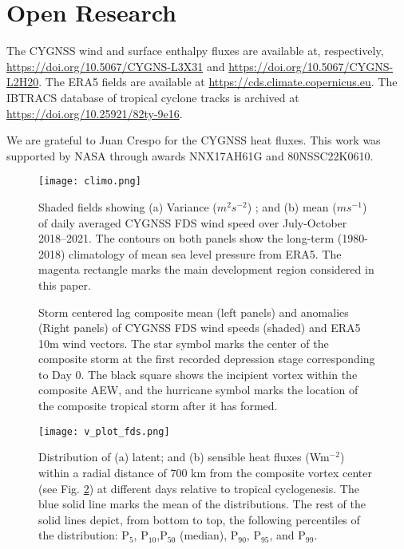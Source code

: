 \documentclass[draft]{agujournal2019}
\begin{document}
%

\section{Open Research}
The CYGNSS wind and surface enthalpy fluxes are available at, respectively, \url{https://doi.org/10.5067/CYGNS-L3X31} and  \url{https://doi.org/10.5067/CYGNS-L2H20}. The ERA5 fields are available at  \url{https://cds.climate.copernicus.eu}. The IBTRACS database of tropical cyclone tracks is archived at \url{https://doi.org/10.25921/82ty-9e16}.


\acknowledgments
We are grateful to Juan Crespo for the CYGNSS heat fluxes. This work was supported by NASA through awards NNX17AH61G and 80NSSC22K0610.


\newpage


\begin{figure}
 \texttt{[image: climo.png]}
 \caption{Shaded fields showing (a) Variance ($m^{2}s^{-2}$) ; and (b) mean ($ms^{-1}$)  of daily averaged CYGNSS FDS wind speed over July-October 2018--2021. The contours on both panels show the long-term (1980-2018) climatology of mean sea level pressure from ERA5. The magenta rectangle marks the main development region considered in this paper.}
 \label{fig:climo}
\end{figure}

%
\begin{figure}
 \caption{Storm centered lag composite mean (left panels) and anomalies (Right panels) of CYGNSS FDS wind speeds (shaded) and ERA5 10m wind vectors. The star symbol marks the center of the composite storm at the first recorded depression stage corresponding to Day 0. The black square shows the incipient vortex within the composite AEW, and the hurricane symbol marks the location of the composite tropical storm after it has formed.}
 \label{fig:comp}
\end{figure}


\begin{figure}
 \texttt{[image: v\_plot\_fds.png]}
 \caption{Distribution of (a) latent; and (b) sensible heat fluxes (Wm$^{-2}$) within a radial distance of 700 km from the composite vortex center (see Fig. \ref{fig:comp}) at different days relative to tropical cyclogenesis. The blue solid line marks the mean of the distributions. The rest of the solid lines depict, from bottom to top, the following percentiles of the distribution: P$_5$, P$_{10}$,P$_{50}$ (median), P$_{90}$, P$_{95}$, and P$_{99}$.}
 \label{fig:vplot_fds}
\end{figure}
\end{document}
